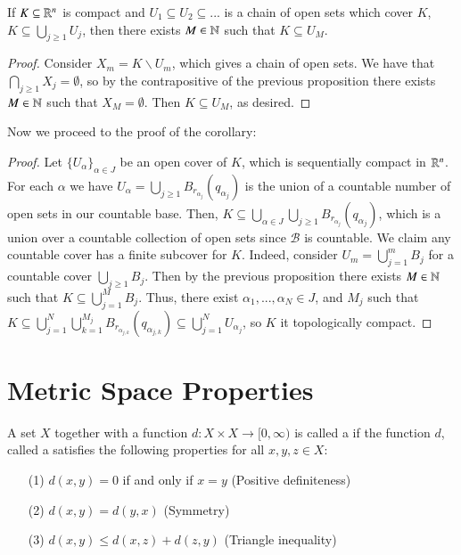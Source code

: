 \begin{prop}
    If $K \subseteq \mathbb R^n$ is compact and $U_1\subseteq U_2\subseteq ...$ is a chain of open sets which cover $K$, $K \subseteq \bigcup_{j\geq 1}U_j$, then there exists $M \in \mathbb N$ such that $K \subseteq U_M$.
\end{prop}
\begin{proof}
    Consider $X_m = K\backslash U_m$, which gives a chain of open sets. We have that $\bigcap_{j\geq 1}X_j = \emptyset$, so by the contrapositive of the previous proposition there exists $M \in \mathbb N$ such that $X_M = \emptyset$. Then $K \subseteq U_M$, as desired.
\end{proof}

Now we proceed to the proof of the corollary:

\begin{proof}
    Let $\{U_{\alpha}\}_{\alpha \in J}$ be an open cover of $K$, which is sequentially compact in $\mathbb R^n$. For each $\alpha$ we have $U_{\alpha} = \bigcup_{j\geq 1}B_{r_{\alpha_j}}(q_{\alpha_j})$ is the union of a countable number of open sets in our countable base. Then, $K \subseteq \bigcup_{\alpha \in J}\bigcup_{j\geq 1}B_{r_{\alpha_j}}(q_{\alpha_j})$, which is a union over a countable collection of open sets since $\mathcal{B}$ is countable. We claim any countable cover has a finite subcover for $K$. Indeed, consider $U_m = \bigcup_{j=1}^mB_j$ for a countable cover $\bigcup_{j\geq 1}B_j$. Then by the previous proposition there exists $M \in \mathbb N$ such that $K \subseteq \bigcup_{j=1}^MB_j$. Thus, there exist $\alpha_1,...,\alpha_N \in J$, and $M_j$ such that $K \subseteq \bigcup_{j=1}^N\bigcup_{k=1}^{M_j}B_{r_{\alpha_{j,k}}}(q_{\alpha_{j,k}}) \subseteq \bigcup_{j=1}^NU_{\alpha_j}$, so $K$ it topologically compact.
\end{proof}





\section{Metric Space Properties}

\begin{defn}
    A set $X$ together with a function $d:X\times X\rightarrow [0,\infty)$ is called a  if the function $d$, called a  satisfies the following properties for all $x,y,z \in X$:
    \begin{itemize}
        \item[(1)] $d(x,y) = 0$ if and only if $x = y$ (Positive definiteness)
        \item[(2)] $d(x,y) = d(y,x)$ (Symmetry) 
        \item[(3)] $d(x,y) \leq d(x,z) + d(z,y)$ (Triangle inequality)
    \end{itemize}
\end{defn}

